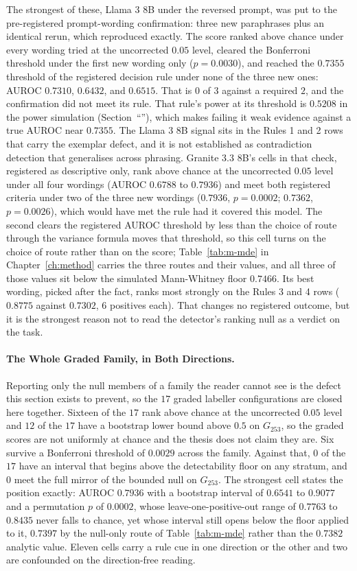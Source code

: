 The strongest of these, Llama 3 8B under the reversed prompt, was put to
the pre-registered prompt-wording confirmation: three new paraphrases plus an
identical rerun, which reproduced exactly. The score ranked above chance under every wording tried at the uncorrected $0.05$ level,
cleared the Bonferroni threshold under the first new wording only ($p = 0.0030$), and reached the $0.7355$ threshold of the registered decision rule under none of the three new ones: AUROC
$0.7310$, $0.6432$, and $0.6515$. That is $0$ of $3$ against a required $2$, and the confirmation did not meet its rule. That rule's power at its
threshold is $0.5208$ in the power simulation (Section~``''), which makes
failing it weak evidence against a true AUROC near $0.7355$. The Llama 3 8B signal sits in the Rules 1 and 2 rows
that carry the exemplar defect, and it is not
established as contradiction detection that generalises across phrasing.
Granite 3.3 8B's cells in that check, registered as descriptive only, rank above
chance at the uncorrected $0.05$ level under all four wordings (AUROC $0.6788$
to $0.7936$) and meet both registered criteria under two of the three new
wordings ($0.7936$, $p = 0.0002$; $0.7362$, $p = 0.0026$), which would have met the rule had it
covered this model. The second clears the registered AUROC threshold by less than the choice of route through
the variance formula moves that threshold, so this cell turns on the choice of route rather than on the
score; Table~\ref{tab:m-mde} in Chapter~\ref{ch:method} carries the three routes and their values, and
all three of those values sit below the simulated Mann-Whitney floor $0.7466$. Its best wording, picked after the fact, ranks most strongly on
the Rules 3 and 4 rows ($0.8775$ against $0.7302$, $6$ positives
each). That changes no registered outcome, but it is the strongest reason not to
read the detector's ranking null as a verdict on the task.

\paragraph{The Whole Graded Family, in Both Directions.} Reporting only the null
members of a family the reader cannot see is the defect this section exists to prevent, so the
$17$ graded labeller configurations are closed here together. Sixteen of the $17$ rank above
chance at the uncorrected $0.05$ level and $12$ of the $17$ have a bootstrap lower bound above
$0.5$ on $G_{253}$, so the graded scores are not uniformly at chance and the thesis does not
claim they are. Six survive a Bonferroni threshold of $0.0029$ across the family. Against that,
$0$ of the $17$ have an interval that begins above the detectability floor on any stratum, and
$0$ meet the full mirror of the bounded null on $G_{253}$. The strongest cell states the
position exactly: AUROC $0.7936$ with a bootstrap interval of $0.6541$ to $0.9077$ and a
permutation $p$ of $0.0002$, whose leave-one-positive-out range of $0.7763$ to $0.8435$ never
falls to chance, yet whose interval still opens below the floor applied to it, $0.7397$ by the null-only route of
Table~\ref{tab:m-mde} rather than the $0.7382$ analytic value. Eleven cells carry a rule cue in one
direction or the other and two are confounded on the direction-free reading.

